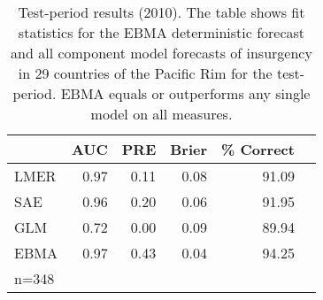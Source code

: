 \begin{table}[p]
\small
\begin{center}
  \caption{\footnotesize Test-period results (2010).  The table shows
    fit statistics for the EBMA deterministic forecast and all
    component model forecasts of insurgency in 29 countries of the
    Pacific Rim for the test-period.  EBMA equals or outperforms any single model on all
    measures.}\label{OutSam1}
\begin{tabular}{lrrrrr}
  \toprule
 & AUC & PRE & Brier & \% Correct   \\ 
  \midrule
LMER & 0.97 & 0.11 & 0.08 & 91.09\\
SAE  & 0.96 & 0.20 & 0.06 & 91.95\\
GLM & 0.72 & 0.00 & 0.09 & 89.94\\
EBMA & 0.97 & 0.43 & 0.04 & 94.25 \\
   \bottomrule
n=348 \\
\end{tabular}
\end{center}
\end{table}

